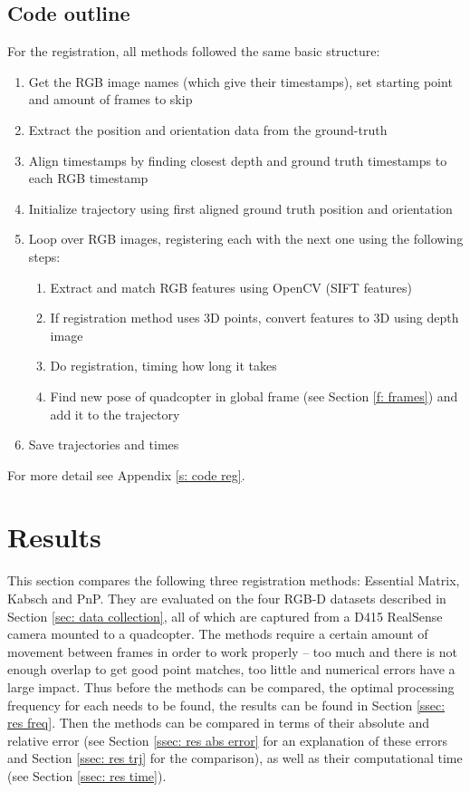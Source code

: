\documentclass[12pt,a4paper]{article}
\begin{document}
  \subsection{Code outline}
    \label{ssec: code outline}
    For the registration, all methods followed the same basic structure: 
    \begin{enumerate}
      \item Get the RGB image names (which give their timestamps), set starting point and amount of frames to skip
      \item Extract the position and orientation data from the ground-truth
      \item Align timestamps by finding closest depth and ground truth timestamps to each RGB timestamp
      \item Initialize trajectory using first aligned ground truth position and orientation
      \item Loop over RGB images, registering each with the next one using the following steps:
      \begin{enumerate}
        \item Extract and match RGB features using OpenCV (SIFT features)
        \item If registration method uses 3D points, convert features to 3D using depth image
        \item Do registration, timing how long it takes
        \item Find new pose of quadcopter in global frame (see Section \ref{f: frames}) and add it to the trajectory
      \end{enumerate}
      \item Save trajectories and times
    \end{enumerate}
    For more detail see Appendix \ref{s: code reg}.

\section{Results}
  \label{sec: res}
  This section compares the following three registration methods: Essential Matrix, Kabsch and PnP. They are evaluated on the four RGB-D datasets described in Section \ref{sec: data collection}, all of which are captured from a D415 RealSense camera mounted to a quadcopter. The methods require a certain amount of movement between frames in order to work properly -- too much and there is not enough overlap to get good point matches, too little and numerical errors have a large impact. Thus before the methods can be compared, the optimal processing frequency for each needs to be found, the results can be found in Section \ref{ssec: res freq}. Then the methods can be compared in terms of their absolute and relative error (see Section \ref{ssec: res abs error} for an explanation of these errors and Section \ref{ssec: res trj} for the comparison), as well as their computational time (see Section \ref{ssec: res time}). 
  
\end{document}
